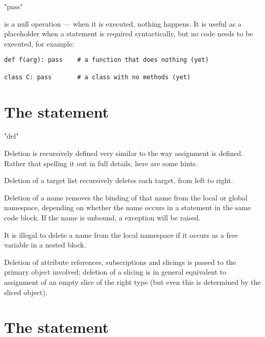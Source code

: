 \begin{productionlist}
             {"pass"}
\end{productionlist}

 is a null operation --- when it is executed, nothing
happens.  It is useful as a placeholder when a statement is
required syntactically, but no code needs to be executed, for example:

\begin{verbatim}
def f(arg): pass    # a function that does nothing (yet)

class C: pass       # a class with no methods (yet)
\end{verbatim}


\section{The  statement \label{del}}

\begin{productionlist}
             {"del" }
\end{productionlist}

Deletion is recursively defined very similar to the way assignment is
defined. Rather that spelling it out in full details, here are some
hints.

Deletion of a target list recursively deletes each target, from left
to right.

Deletion of a name removes the binding of that name 
from the local or global namespace, depending on whether the name
occurs in a  statement in the same code block.  If the
name is unbound, a  exception will be raised.

It is illegal to delete a name from the local namespace if it occurs
as a free variable in a nested block.

Deletion of attribute references, subscriptions and slicings
is passed to the primary object involved; deletion of a slicing
is in general equivalent to assignment of an empty slice of the
right type (but even this is determined by the sliced object).


\section{The  statement \label{return}}

